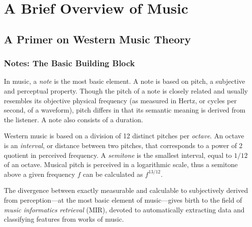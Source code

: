 \chapter{A Brief Overview of Music}

\section{A Primer on Western Music Theory}

\subsection{Notes: The Basic Building Block}

In music, a \textit{note} is the most basic element. A note is based on pitch, a subjective and perceptual property. Though the pitch of a note is closely related and usually resembles its objective physical frequency (as measured in Hertz, or cycles per second, of a waveform), pitch differs in that its semantic meaning is derived from the listener. A note also consists of a duration.

Western music is based on a division of 12 distinct pitches per \textit{octave}. An octave is an \textit{interval}, or distance between two pitches, that corresponds to a power of 2 quotient in perceived frequency. A \textit{semitone} is the smallest interval, equal to $1/12$ of an octave. Musical pitch is perceived in a logarithmic scale, thus a semitone above a given frequency $f$ can be calculated as $f^{13/12}$.

The divergence between exactly measurable and calculable to subjectively derived from perception---at the most basic element of music---gives birth to the field of \textit{music informatics retrieval} (MIR), devoted to automatically extracting data and classifying features from works of music.